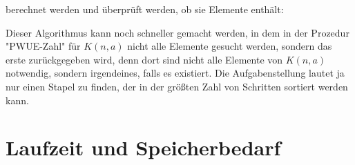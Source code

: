 \documentclass[a4paper,10pt,ngerman]{scrartcl}
\begin{document}
berechnet werden und überprüft werden, ob sie Elemente enthält:
\begin{algorithmic}
  \EndIf
  \EndFor
  \EndProcedure
  \EndIf
  \EndIf
  \EndIf
  \EndIf
  \Else
  \EndIf
  \EndIf
  \EndIf
  \EndFor
  \EndIf
  \EndFor
  \EndIf
  \EndFor
  \EndProcedure
\end{algorithmic}
Dieser Algorithmus kann noch schneller gemacht werden, in dem in der Prozedur "PWUE-Zahl" für $K(n,a)$ nicht alle Elemente gesucht werden, sondern das
erste zurückgegeben wird, denn dort sind nicht alle Elemente von $K(n,a)$ notwendig, sondern irgendeines, falls es existiert. Die Aufgabenstellung lautet ja nur einen
Stapel zu finden, der in der größten Zahl von Schritten sortiert werden kann.
\section{Laufzeit und Speicherbedarf}
\end{document}
